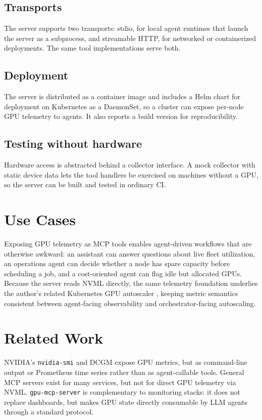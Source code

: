 \documentclass[11pt]{article}
\begin{document}
\subsection{Transports}
The server supports two transports: stdio, for local agent runtimes that launch
the server as a subprocess, and streamable HTTP, for networked or containerized
deployments. The same tool implementations serve both.

\subsection{Deployment}
The server is distributed as a container image and includes a Helm chart for
deployment on Kubernetes as a DaemonSet, so a cluster can expose per-node GPU
telemetry to agents. It also reports a build version for reproducibility.

\subsection{Testing without hardware}
Hardware access is abstracted behind a collector interface. A mock collector with
static device data lets the tool handlers be exercised on machines without a GPU,
so the server can be built and tested in ordinary CI.

\section{Use Cases}

Exposing GPU telemetry as MCP tools enables agent-driven workflows that are
otherwise awkward: an assistant can answer questions about live fleet
utilization, an operations agent can decide whether a node has spare capacity
before scheduling a job, and a cost-oriented agent can flag idle but allocated
GPUs. Because the server reads NVML directly, the same telemetry foundation
underlies the author's related Kubernetes GPU autoscaler \cite{kgs}, keeping
metric semantics consistent between agent-facing observability and
orchestrator-facing autoscaling.

\section{Related Work}

NVIDIA's \texttt{nvidia-smi} and DCGM expose GPU metrics, but as command-line
output or Prometheus time series rather than as agent-callable tools. General MCP
servers exist for many services, but not for direct GPU telemetry via NVML.
\texttt{gpu-mcp-server} is complementary to monitoring stacks: it does not replace
dashboards, but makes GPU state directly consumable by LLM agents through a
standard protocol.
\end{document}
